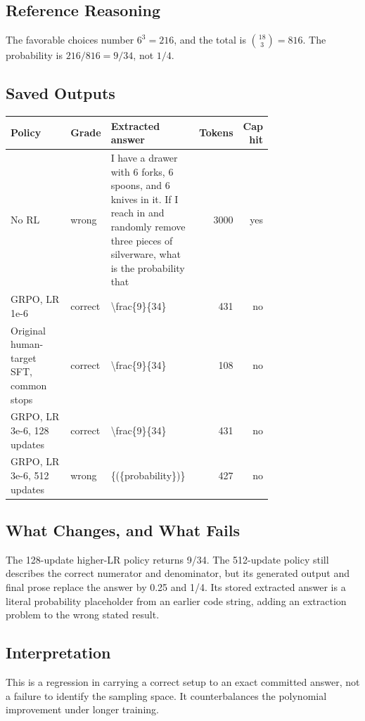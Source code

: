 \documentclass[10pt,letterpaper]{article}
\begin{document}
\subsection*{Reference Reasoning}
The favorable choices number $6^3=216$, and the total is $\binom{18}{3}=816$. The probability is $216/816=9/34$, not $1/4$.
\subsection*{Saved Outputs}
\small\begin{longtable}{p{0.29\linewidth}p{0.10\linewidth}p{0.35\linewidth}rr}\toprule Policy & Grade & Extracted answer & Tokens & Cap hit\\\midrule
No RL & wrong & I have a drawer with 6 forks, 6 spoons, and 6 knives in it. If I reach in and randomly remove three pieces of silverware, what is the probability that & 3000 & yes\\
GRPO, LR 1e-6 & correct & \textbackslash{}frac\{9\}\{34\} & 431 & no\\
Original human-target SFT, common stops & correct & \textbackslash{}frac\{9\}\{34\} & 108 & no\\
GRPO, LR 3e-6, 128 updates & correct & \textbackslash{}frac\{9\}\{34\} & 431 & no\\
GRPO, LR 3e-6, 512 updates & wrong & \{(\{probability\})\} & 427 & no\\
\bottomrule\end{longtable}\normalsize
\subsection*{What Changes, and What Fails}
The 128-update higher-LR policy returns 9/34. The 512-update policy still describes the correct numerator and denominator, but its generated output and final prose replace the answer by 0.25 and 1/4. Its stored extracted answer is a literal probability placeholder from an earlier code string, adding an extraction problem to the wrong stated result.
\subsection*{Interpretation}
This is a regression in carrying a correct setup to an exact committed answer, not a failure to identify the sampling space. It counterbalances the polynomial improvement under longer training.
\end{document}
